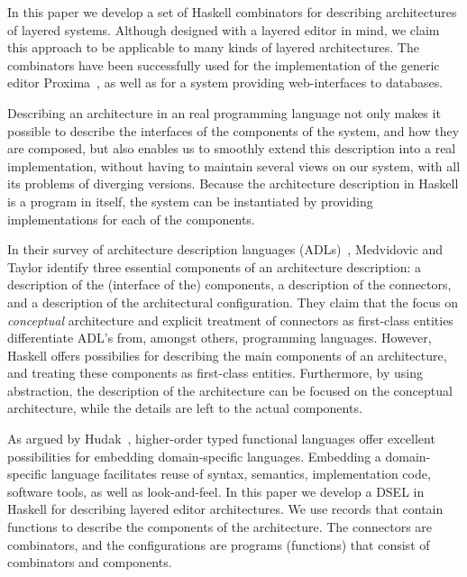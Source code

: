 \documentclass[preprint,natbib]{sigplanconf}
\begin{document}
In this paper we develop a set of Haskell combinators for describing architectures of layered systems. Although designed with a layered editor in mind, we claim this approach to be applicable to many kinds of layered architectures. The combinators have been successfully used for the implementation of the generic editor Proxima~\cite{Schrage04Proxima}, as well as for a system providing web-interfaces to databases. 

Describing an architecture in an real programming language not only makes it possible to describe the interfaces of the components of the system, and how they are composed, but also enables us to smoothly extend this description into a real implementation, without having to maintain several views on our system, with all its problems of diverging versions. Because the architecture description in Haskell is a program in itself, the system can be instantiated by providing implementations for each of the components.

In their survey of architecture description languages (ADLs)~\cite{medvidovic00ADLs}, Medvidovic and Taylor identify three essential components of an architecture description: a description of the (interface of the) components, a description of the connectors, and a description of the architectural configuration. They claim that the focus on {\em conceptual} architecture and explicit treatment of connectors as first-class entities differentiate ADL's from, amongst others, programming languages. However, Haskell offers possibilies for describing the main components of an architecture, and treating these components as first-class entities. Furthermore, by using abstraction, the description of the architecture can be focused on the conceptual architecture, while the details are left to the actual components. 


As argued by Hudak~\cite{hudak98DSLs}, higher-order typed functional languages offer excellent possibilities for embedding domain-specific languages.  Embedding a domain-specific language facilitates reuse of syntax, semantics, implementation code, software tools, as well as look-and-feel. In this paper we develop a DSEL in Haskell for describing layered editor architectures. We use records that contain functions to describe the components of the architecture. The connectors are combinators, and the configurations are programs (functions) that consist of combinators and components. 
\end{document}
